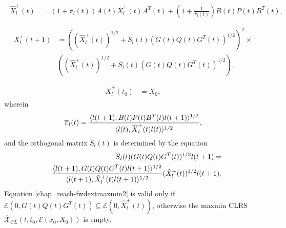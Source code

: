 \documentclass[letterpaper,10pt,english]{sphinxmanual}
\begin{document}
\label{chap_reach:equation-fwdextmaxmin1}\begin{gather}
\begin{split}\hat{X}^+_l(t) & = (1+\overline{\pi}_l(t))A(t)\overline{X}^+_l(t)A^T(t) +
\left(1+\frac{1}{\overline{\pi}_l(t)}\right)
B(t)P(t)B^T(t),  \\\end{split}\label{chap_reach-fwdextmaxmin1}
\end{gather}\label{chap_reach:equation-fwdextmaxmin2}\begin{gather}
\begin{split}\overline{X}^+_l(t+1) & = \left((\hat{X}^+_l(t))^{1/2} +
\overline{S}_l(t)(G(t)Q(t)G^T(t))^{1/2}\right)^T
\times \nonumber \\
& \left((\hat{X}^+_l(t))^{1/2} + \overline{S}_l(t)(G(t)Q(t)G^T(t))^{1/2}\right),\\\end{split}\label{chap_reach-fwdextmaxmin2}
\end{gather}\label{chap_reach:equation-fwdextmaxmin3}\begin{gather}
\begin{split}\overline{X}^+_l(t_0) & = X_0,\end{split}\label{chap_reach-fwdextmaxmin3}
\end{gather}
wherein
\begin{gather}
\begin{split}\overline{\pi}_l(t) = \frac{\langle l(t+1),
B(t)P(t)B^T(t)l(t+1)\rangle^{1/2}}{\langle l(t),
\overline{X}^+_l(t)l(t)\rangle^{1/2}},\end{split}\notag
\end{gather}
and the orthogonal matrix $\overline{S}_l(t)$ is determined by
the equation
\begin{gather}
\begin{split}\begin{aligned}
& & \overline{S}_l(t)(G(t)Q(t)G^T(t))^{1/2}l(t+1) = \\
& & \frac{\langle l(t+1),
G(t)Q(t)G^T(t)l(t+1)\rangle^{1/2}}{\langle l(t+1),
\hat{X}^+_l(t)l(t+1)\rangle^{1/2}}(\hat{X}^+_l(t))^{1/2}l(t+1).\end{aligned}\end{split}\notag
\end{gather}
Equation \eqref{chap_reach-fwdextmaxmin2} is valid only if
${\mathcal E}(0,G(t)Q(t)G^T(t))\subseteq{\mathcal E}(0,\hat{X}^+_l(t))$,
otherwise the maxmin CLRS
$\overline{{\mathcal X}}_{CL}(t,t_0,{\mathcal E}(x_0,X_0))$ is
empty.
\end{document}
